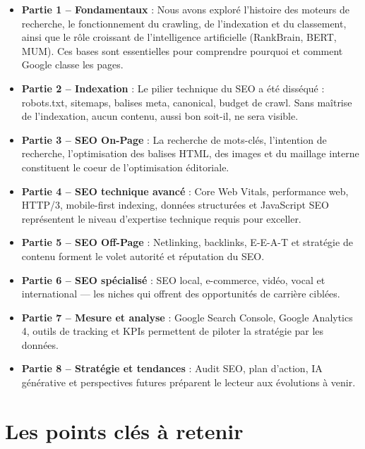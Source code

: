 \documentclass[12pt,a4paper,twoside]{report}
\begin{document}
\begin{itemize}
    \item \textbf{Partie 1 -- Fondamentaux} : Nous avons exploré l'histoire des moteurs de recherche, le fonctionnement du crawling, de l'indexation et du classement, ainsi que le rôle croissant de l'intelligence artificielle (RankBrain, BERT, MUM). Ces bases sont essentielles pour comprendre pourquoi et comment Google classe les pages.
    \item \textbf{Partie 2 -- Indexation} : Le pilier technique du SEO a été disséqué : robots.txt, sitemaps, balises meta, canonical, budget de crawl. Sans maîtrise de l'indexation, aucun contenu, aussi bon soit-il, ne sera visible.
    \item \textbf{Partie 3 -- SEO On-Page} : La recherche de mots-clés, l'intention de recherche, l'optimisation des balises HTML, des images et du maillage interne constituent le coeur de l'optimisation éditoriale.
    \item \textbf{Partie 4 -- SEO technique avancé} : Core Web Vitals, performance web, HTTP/3, mobile-first indexing, données structurées et JavaScript SEO représentent le niveau d'expertise technique requis pour exceller.
    \item \textbf{Partie 5 -- SEO Off-Page} : Netlinking, backlinks, E-E-A-T et stratégie de contenu forment le volet autorité et réputation du SEO.
    \item \textbf{Partie 6 -- SEO spécialisé} : SEO local, e-commerce, vidéo, vocal et international — les niches qui offrent des opportunités de carrière ciblées.
    \item \textbf{Partie 7 -- Mesure et analyse} : Google Search Console, Google Analytics 4, outils de tracking et KPIs permettent de piloter la stratégie par les données.
    \item \textbf{Partie 8 -- Stratégie et tendances} : Audit SEO, plan d'action, IA générative et perspectives futures préparent le lecteur aux évolutions à venir.
\end{itemize}

\section*{Les points clés à retenir}
\end{document}
